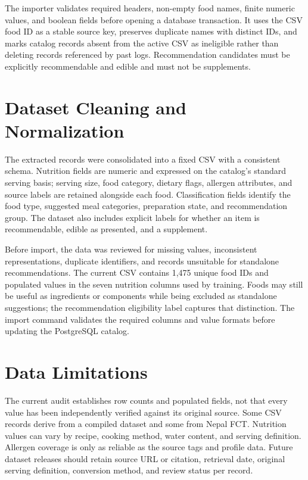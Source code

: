 \documentclass[12pt,a4paper]{report}
\begin{document}
The importer validates required headers, non-empty food names, finite numeric values,
and boolean fields before opening a database transaction. It uses the CSV food ID as a
stable source key, preserves duplicate names with distinct IDs, and marks catalog records
absent from the active CSV as ineligible rather than deleting records referenced by past
logs. Recommendation candidates must be explicitly recommendable and edible and must
not be supplements.

\section{Dataset Cleaning and Normalization}
The extracted records were consolidated into a fixed CSV with a consistent schema.
Nutrition fields are numeric and expressed on the catalog's standard serving basis;
serving size, food category, dietary flags, allergen attributes, and source labels are
retained alongside each food. Classification fields identify the food type, suggested
meal categories, preparation state, and recommendation group. The dataset also includes
explicit labels for whether an item is recommendable, edible as presented, and a
supplement.

Before import, the data was reviewed for missing values, inconsistent representations,
duplicate identifiers, and records unsuitable for standalone recommendations. The
current CSV contains 1,475 unique food IDs and populated values in the seven nutrition
columns used by training. Foods may still be useful as ingredients or components while
being excluded as standalone suggestions; the recommendation eligibility label captures
that distinction. The import command validates the required columns and value formats
before updating the PostgreSQL catalog.

\section{Data Limitations}
The current audit establishes row counts and populated fields, not that every value has
been independently verified against its original source. Some CSV records derive from a
compiled dataset and some from Nepal FCT. Nutrition values can vary by recipe, cooking
method, water content, and serving definition. Allergen coverage is only as reliable as
the source tags and profile data. Future dataset releases should retain source URL or
citation, retrieval date, original serving definition, conversion method, and review
status per record.
\end{document}
